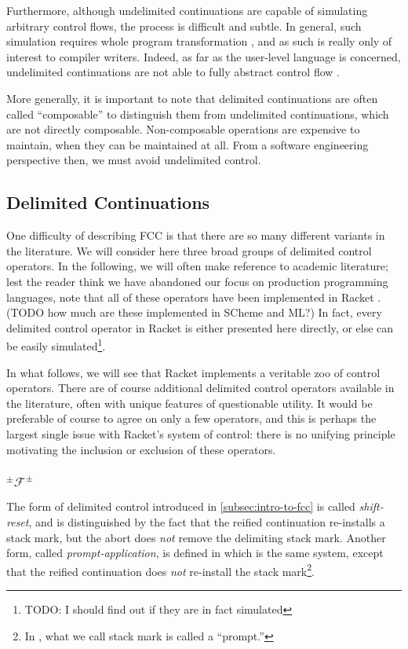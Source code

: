 \documentclass[11pt]{article}
\newcommand\F{\mathcal{F}}
\newcommand\pmFpm{^\pm\F^\pm}
\begin{document}
Furthermore, although undelimited continuations are capable of simulating arbitrary control flows, the process is difficult and subtle.
In general, such simulation requires whole program transformation \cite{Filinski94}, and as such is really only of interest to compiler writers.
Indeed, as far as the user-level language is concerned, undelimited continuations are not able to fully abstract control flow \cite{Sitaram90}.

More generally, it is important to note that delimited continuations are often called ``composable'' to distinguish them from undelimited continuations, which are not directly composable.
Non-composable operations are expensive to maintain, when they can be maintained at all.
From a software engineering perspective then, we must avoid undelimited control.

\subsection{Delimited Continuations}
\label{delimControl}

One difficulty of describing FCC is that there are so many different variants in the literature.
We will consider here three broad groups of delimited control operators.
In the following, we will often make reference to academic literature;
lest the reader think we have abandoned our focus on production programming languages, note that all of these operators have been implemented in Racket \cite{RacketReference}. 
(TODO how much are these implemented in SCheme and ML?)
In fact, every delimited control operator in Racket is either presented here directly, or else can be easily simulated\footnote{TODO: I should find out if they are in fact simulated}.

In what follows, we will see that Racket implements a veritable zoo of control operators.
There are of course additional delimited control operators available in the literature, often with unique features of questionable utility.
It would be preferable of course to agree on only a few operators, and this is perhaps the largest single issue with Racket's system of control: there is no unifying principle motivating the inclusion or exclusion of these operators.

\subsubsection{$\pmFpm$}

The form of delimited control introduced in \ref{subsec:intro-to-fcc} is called \textit{shift-reset}, and is distinguished by the fact that the reified continuation re-installs a stack mark, but the abort does \emph{not} remove the delimiting stack mark.
Another form, called \emph{prompt-application}, is defined in \cite{PromptApplication} which is the same system, except that the reified continuation does \emph{not} re-install the stack mark\footnote{In \cite{PromptApplication}, what we call stack mark is called a ``prompt.''}.
\end{document}
